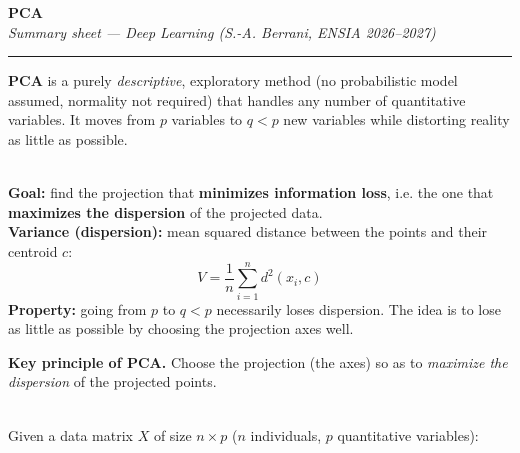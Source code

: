 \documentclass[10pt,a4paper]{article}
\begin{document}
\begin{center}
    {\LARGE\bfseries\color{themeblue} PCA}\\[3pt]
    {\small\itshape Summary sheet --- Deep Learning (S.-A. Berrani, ENSIA 2026--2027)}\\[3pt]
    \textcolor{themeblue}{\rule{\textwidth}{0.6pt}}
\end{center}

\begin{tcolorbox}[
    colframe=themeblue,
    colback=lightbg,
    coltitle=white,
    fonttitle=\bfseries\sffamily,
    title={Core idea \& notation},
    arc=2mm,
    boxrule=0.6pt,
    left=8pt, right=8pt, top=6pt, bottom=6pt
]
\textbf{PCA} is a purely \textit{descriptive}, exploratory method (no probabilistic model assumed, normality not required) that handles any number of quantitative variables. It moves from $p$ variables to $q < p$ new variables while distorting reality as little as possible.
\end{tcolorbox}

\vspace{4pt}

\\[4pt]
\textbf{Goal:} find the projection that \textbf{minimizes information loss}, i.e. the one that \textbf{maximizes the dispersion} of the projected data.\\
\textbf{Variance (dispersion):} mean squared distance between the points and their centroid $c$:
\[
V = \frac{1}{n} \sum_{i=1}^n d^2(x_i, c)
\]
\textbf{Property:} going from $p$ to $q < p$ necessarily loses dispersion. The idea is to lose as little as possible by choosing the projection axes well.\\[4pt]
\begin{tcolorbox}[
    colframe=accentred,
    colback=white,
    arc=1.5mm,
    boxrule=0.5pt,
    left=8pt, right=8pt, top=5pt, bottom=5pt
]
\textbf{Key principle of PCA.} Choose the projection (the axes) so as to \textit{maximize the dispersion} of the projected points.
\end{tcolorbox}

\vspace{6pt}

\\[4pt]
Given a data matrix $X$ of size $n \times p$ ($n$ individuals, $p$ quantitative variables):
\end{document}
